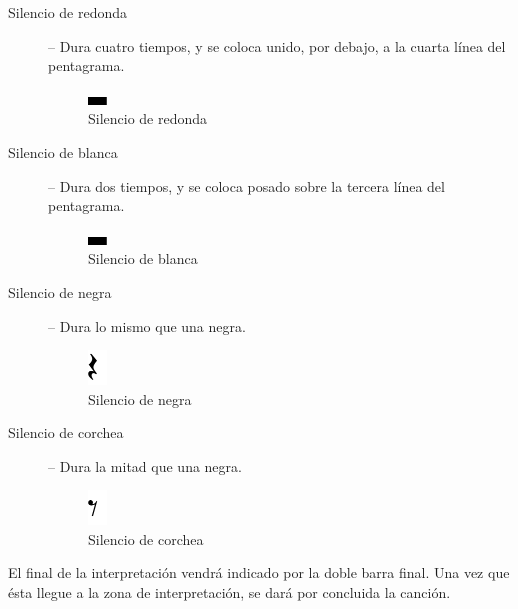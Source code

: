 \begin{description}
\item[Silencio de redonda] -- Dura cuatro tiempos, y se coloca unido, por
  debajo, a la cuarta línea del pentagrama.

\begin{figure}[h!]
  \centering
  \includegraphics[width=0.05\textwidth]{apendice_manual_usuario/imagen_silBlanca}
  \caption{Silencio de redonda}
\end{figure}


\item[Silencio de blanca] -- Dura dos tiempos, y se coloca posado sobre la
  tercera línea del pentagrama.

\begin{figure}[h!]
  \centering
  \includegraphics[width=0.05\textwidth]{apendice_manual_usuario/imagen_silBlanca}
  \caption{Silencio de blanca}
\end{figure}


\item[Silencio de negra] -- Dura lo mismo que una negra.
\begin{figure}[h!]
  \centering
  \includegraphics[width=0.05\textwidth]{apendice_manual_usuario/imagen_silNegra}
  \caption{Silencio de negra}
\end{figure}

\item[Silencio de corchea] -- Dura la mitad que una negra.
\begin{figure}[h!]
  \centering
  \includegraphics[width=0.05\textwidth]{apendice_manual_usuario/imagen_silCorchea}
  \caption{Silencio de corchea}
\end{figure}
\end{description}

El final de la interpretación vendrá indicado por la doble barra final. Una vez
que ésta llegue a la zona de interpretación, se dará por concluida la canción.

